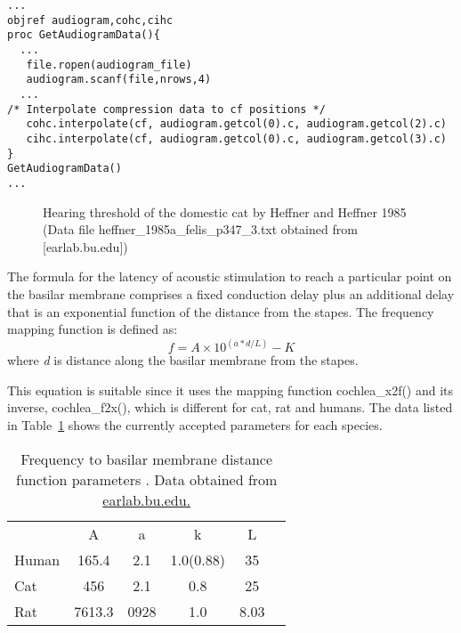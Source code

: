 \begin{appendix}
\begin{lstlisting}[label=lst:getaudiogramdata,caption= Procedure to get audiogram data and interpolate to freuencies in \textsf{cf} vector (Utilities.hoc)]
...
objref audiogram,cohc,cihc
proc GetAudiogramData(){
  ...
   file.ropen(audiogram_file)
   audiogram.scanf(file,nrows,4)
  ...
/* Interpolate compression data to cf positions */
   cohc.interpolate(cf, audiogram.getcol(0).c, audiogram.getcol(2).c)
   cihc.interpolate(cf, audiogram.getcol(0).c, audiogram.getcol(3).c)
}
GetAudiogramData() 
...
\end{lstlisting}

\medskip{}

\begin{figure}[htb]
\begin{center}
\caption{Hearing threshold of the domestic cat by Heffner and Heffner
  1985 \citep{HeffnerHeffner:1985} (Data file
  \mbox{heffner\_1985a\_felis\_p347\_3.txt} obtained from [earlab.bu.edu])}
\label{fig:AudThresholdRat}
\end{center}
\end{figure}


The formula for the latency of acoustic stimulation to reach a
particular point on the basilar membrane comprises a fixed conduction
delay plus an additional delay that is an exponential function of the
distance from the stapes. The frequency mapping function is defined
as:
\[
 f = A\times10^{\left(a*d/L\right)} - K
 \]
where \emph{d} is distance along the basilar membrane from the stapes.

\medskip{}

This equation is suitable since it uses the mapping function
\mbox{\textsf{cochlea\_x2f()}} and its inverse, \mbox{\textsf{cochlea\_f2x()}}, which is
different for cat, rat and humans.  The data listed in
Table~\ref{tab:f2x} shows the currently accepted parameters for each
species.


\begin{table}[h]
  \centering
  \begin{tabular}{lccccc}
    \hline
& A & a & k & L \\
Human &165.4	&2.1	&1.0(0.88)	&35     \\
Cat&456&	2.1&0.8&25 \\
Rat&7613.3	&0928	&1.0&	8.03     \\
    \hline
  \end{tabular}
  \caption{Frequency to basilar membrane distance function parameters \citep{FitzGeraldBurkittEtAl:2001}. Data obtained from \url{earlab.bu.edu.}}\label{tab:f2x}
\end{table}



\end{appendix}

